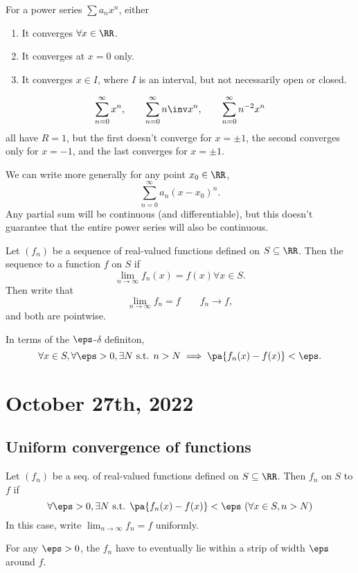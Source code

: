 \documentclass[11pt]{scrartcl}
\numberwithin{equation}{section}
\begin{document}
\begin{corollary}
    For a power series $\sum a_nx^n$, either
    \begin{enumerate}
        \item It converges $\forall x\in\RR$.
        \item It converges at $x=0$ only.
        \item It converges $x\in I$, where $I$ is an interval, but not necessarily open or closed.
    \end{enumerate}
\end{corollary}

\begin{example}
    \[ \sum_{n=0}^{\infty}x^n,\qquad \sum_{n=0}^{\infty}n\inv x^n,\qquad \sum_{n=0}^{\infty}n^{-2} x^n\]
    all have $R=1$, but the first doesn't converge for $x=\pm 1$,
    the second converges only for $x=-1$, and the last converges for 
    $x=\pm 1$.
\end{example}
We can write more generally for any point $x_0\in \RR$,
\[ \sum_{n=0}^{\infty}a_n(x-x_0)^n.\]
Any partial sum will be continuous (and differentiable),
but this doesn't guarantee that the entire power series will also 
be continuous.

\begin{definition}
    Let $(f_n)$ be a sequence of real-valued functions defined on 
    $S\subseteq\RR$. Then the sequence 
    to a function $f$ on $S$ if
    \[\lim_{n\rightarrow \infty}f_n(x)=f(x)\forall x\in S.\]
    Then write that 
    \[\lim_{n\rightarrow \infty}f_n=f \qquad f_n\to f,\]
    and both are pointwise.

    In terms of the $\eps$-$\delta$ definiton, 
    \[ \forall x\in S, \forall \eps>0, \exists N\text{ s.t. } 
    n>N \implies \pa{f_n(x)-f(x)}<\eps.\]
\end{definition}
\clearpage
\section{October 27th, 2022}
\subsection{Uniform convergence of functions}
\begin{definition}
    Let $(f_n)$ be a seq. of real-valued functions defined on 
    $S \subseteq \RR$. Then $f_n$  on $S$
    to $f$ if 
    \[
        \forall \eps>0, \exists N \text{ s.t. } \pa{f_n(x)-f(x)}<\eps \
        (\forall x\in S, n > N)
    \]
    In this case, write $\lim_{n\rightarrow \infty}f_n=f$ uniformly.
\end{definition}
For any $\eps>0$, the $f_n$ have to eventually lie within a strip 
of width $\eps$ around $f$.
\end{document}
